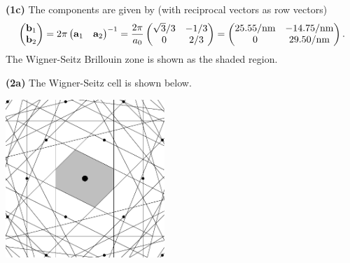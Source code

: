 \documentclass{article}
\makeatletter
\newcommand*{\shifttext}[1]{%
  \settowidth{\@tempdima}{#1}%
  \hspace{-\@tempdima}#1%
}
\newcommand{\plabel}[1]{%
\shifttext{\textbf{#1}\quad}%
}
\makeatother
\begin{document}
\plabel{(1c)}%
The components are given by (with reciprocal vectors as row vectors)
\[ \begin{pmatrix}
    \vb{b}_1 \\
    \vb{b}_2
\end{pmatrix} = 2\pi \begin{pmatrix}
    \vb{a}_1 & \vb{a}_2
\end{pmatrix}^{-1} = \frac{2\pi}{a_0} \begin{pmatrix}
    \sqrt{3}/3 & -1/3 \\
    0 & 2/3
\end{pmatrix} = \begin{pmatrix}
    \SI{25.55}{\per\nano\meter} & \SI{-14.75}{\per\nano\meter} \\
    \num{0} & \SI{29.50}{\per\nano\meter} \\
\end{pmatrix}. \]
The Wigner-Seitz Brillouin zone is shown as the shaded region.
\begin{center}
\end{center}

\plabel{(2a)}%
The Wigner-Seitz cell is shown below.
\begin{center}
    \includegraphics[width=6cm]{img/1.2a.WS/main.pdf}
\end{center}
\end{document}
